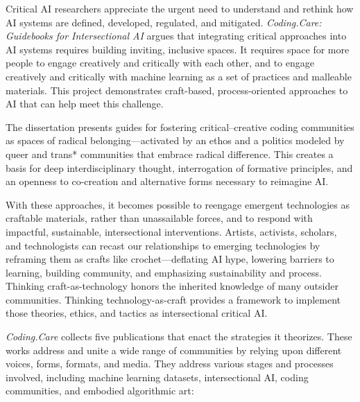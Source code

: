Critical AI researchers appreciate the urgent need to understand and
rethink how AI systems are defined, developed, regulated, and mitigated.
\emph{Coding.Care: Guidebooks for Intersectional AI} argues that
integrating critical approaches into AI systems requires building
inviting, inclusive spaces. It requires space for more people to engage
creatively and critically with each other, and to engage creatively and
critically with machine learning as a set of practices and malleable
materials. This project demonstrates craft-based, process-oriented
approaches to AI that can help meet this challenge.

The dissertation presents guides for fostering critical--creative coding
communities as spaces of radical belonging---activated by an ethos and a
politics modeled by queer and trans* communities that embrace radical
difference. This creates a basis for deep interdisciplinary thought,
interrogation of formative principles, and an openness to co-creation
and alternative forms necessary to reimagine AI.

With these approaches, it becomes possible to reengage emergent
technologies as craftable materials, rather than unassailable forces,
and to respond with impactful, sustainable, intersectional
interventions. Artists, activists, scholars, and technologists can
recast our relationships to emerging technologies by reframing them as
crafts like crochet---deflating AI hype, lowering barriers to learning,
building community, and emphasizing sustainability and process. Thinking
craft-as-technology honors the inherited knowledge of many outsider
communities. Thinking technology-as-craft provides a framework to
implement those theories, ethics, and tactics as intersectional critical
AI.

\emph{Coding.Care} collects five publications that enact the strategies
it theorizes. These works address and unite a wide range of communities
by relying upon different voices, forms, formats, and media. They
address various stages and processes involved, including machine
learning datasets, intersectional AI, coding communities, and embodied
algorithmic art:

